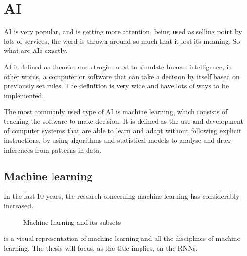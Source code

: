 \section{\acl{AI}}\label{sec:ai}

\acf{AI} is very popular, and is getting more attention, being used as selling point by lots of services, the word is thrown around so much that it lost its meaning. So what are \acp{AI} exactly.

\ac{AI} is defined as theories and stragies used to simulate human intelligence, in other words, a computer or software that can take a decision by itself based on previously set rules. The definition is very wide and have lots of ways to be implemented.

The most commonly used type of \ac{AI} is machine learning, which consists of teaching the software to make decision. It is defined as the use and development of computer systems that are able to learn and adapt without following explicit instructions, by using algorithms and statistical models to analyse and draw inferences from patterns in data.

\subsection{Machine learning}

In the last 10 years, the research concerning machine learning has considerably increased.

\begin{figure}[H]
  \centering
  
  \caption{Machine learning and its subsets}
  \label{fig:ml}
\end{figure}

 is a visual representation of machine learning and all the disciplines of machine learning. The thesis will focus, as the title implies, on the \aclp{RNN}.
